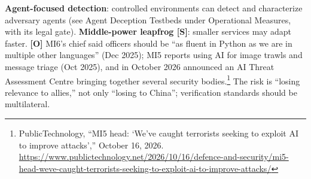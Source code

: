 \documentclass[11pt,letterpaper]{article}
\begin{document}
\begin{infobox}
\textbf{Agent-focused detection}: controlled environments can detect and characterize adversary agents (see Agent Deception Testbeds under Operational Measures, with its legal gate). \textbf{Middle-power leapfrog [S]}: smaller services may adapt faster. \textbf{[O]} MI6's chief said officers should be ``as fluent in Python as we are in multiple other languages'' (Dec 2025); MI5 reports using AI for image trawls and message triage (Oct 2025), and in October 2026 announced an AI Threat Assessment Centre bringing together several security bodies.\footnote{PublicTechnology, ``MI5 head: `We've caught terrorists seeking to exploit AI to improve attacks','' October 16, 2026. \url{https://www.publictechnology.net/2026/10/16/defence-and-security/mi5-head-weve-caught-terrorists-seeking-to-exploit-ai-to-improve-attacks/}} The risk is ``losing relevance to allies,'' not only ``losing to China''; verification standards should be multilateral.
\end{infobox}
\end{document}
